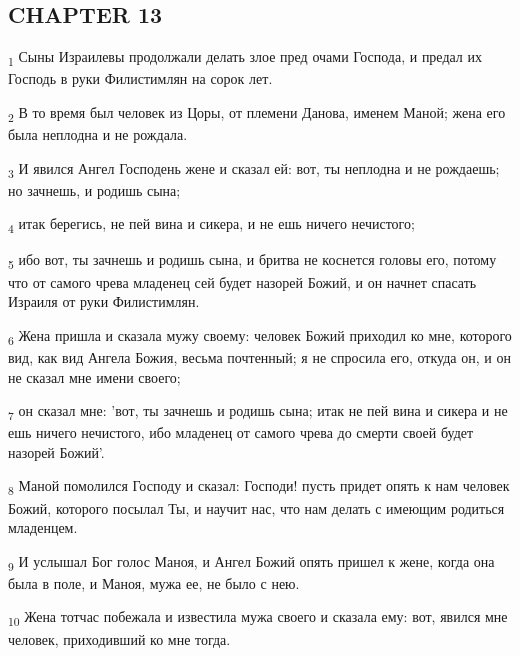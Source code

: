 \subsection{CHAPTER 13}
\begin{tcolorbox}
\textsubscript{1} Сыны Израилевы продолжали делать злое пред очами Господа, и предал их Господь в руки Филистимлян на сорок лет.
\end{tcolorbox}
\begin{tcolorbox}
\textsubscript{2} В то время был человек из Цоры, от племени Данова, именем Маной; жена его была неплодна и не рождала.
\end{tcolorbox}
\begin{tcolorbox}
\textsubscript{3} И явился Ангел Господень жене и сказал ей: вот, ты неплодна и не рождаешь; но зачнешь, и родишь сына;
\end{tcolorbox}
\begin{tcolorbox}
\textsubscript{4} итак берегись, не пей вина и сикера, и не ешь ничего нечистого;
\end{tcolorbox}
\begin{tcolorbox}
\textsubscript{5} ибо вот, ты зачнешь и родишь сына, и бритва не коснется головы его, потому что от самого чрева младенец сей будет назорей Божий, и он начнет спасать Израиля от руки Филистимлян.
\end{tcolorbox}
\begin{tcolorbox}
\textsubscript{6} Жена пришла и сказала мужу своему: человек Божий приходил ко мне, которого вид, как вид Ангела Божия, весьма почтенный; я не спросила его, откуда он, и он не сказал мне имени своего;
\end{tcolorbox}
\begin{tcolorbox}
\textsubscript{7} он сказал мне: 'вот, ты зачнешь и родишь сына; итак не пей вина и сикера и не ешь ничего нечистого, ибо младенец от самого чрева до смерти своей будет назорей Божий'.
\end{tcolorbox}
\begin{tcolorbox}
\textsubscript{8} Маной помолился Господу и сказал: Господи! пусть придет опять к нам человек Божий, которого посылал Ты, и научит нас, что нам делать с имеющим родиться младенцем.
\end{tcolorbox}
\begin{tcolorbox}
\textsubscript{9} И услышал Бог голос Маноя, и Ангел Божий опять пришел к жене, когда она была в поле, и Маноя, мужа ее, не было с нею.
\end{tcolorbox}
\begin{tcolorbox}
\textsubscript{10} Жена тотчас побежала и известила мужа своего и сказала ему: вот, явился мне человек, приходивший ко мне тогда.
\end{tcolorbox}
